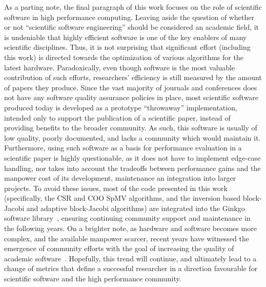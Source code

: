 As a parting note, the final paragraph of this work focuses on the role of
scientific software in high performance computing. Leaving aside the question of
whether or not ``scientific software engineering'' should be considered an
academic field, it is undeniable that highly efficient software is one of the
key enablers of many scientific disciplines. Thus, it is not surprising that
significant effort (including this work) is directed towards the optimization of
various algorithms for the latest hardware. Paradoxically, even though software
is the most valuable contribution of such efforts, researchers' efficiency is
still measured by the amount of papers they produce. Since the vast majority of
journals and conferences does not have any software quality assurance policies
in place, most scientific software produced today is developed as a prototype
``throwaway'' implementation, intended only to support the publication of a
scientific paper, instead of providing benefits to the broader community. As
such, this software is usually of low quality, poorly documented, and lacks a
community which would maintain it. Furthermore, using such software as a basis
for performance evaluation in a scientific paper is highly questionable, as it
does not have to implement edge-case handling, nor takes into account the
tradeoffs between performance gains and the manpower cost of its development,
maintenance an integration into larger projects. To avoid these issues, most of
the code presented in this work (specifically, the CSR and COO SpMV algorithms,
and the inversion based block-Jacobi and adaptive block-Jacobi algorithms) are
integrated into the Ginkgo software library~\cite{ginkgo}, ensuring continuing
community support and maintenance in the following years. On a brighter note, as
hardware and software becomes more complex, and the available manpower scarcer,
recent years have witnessed the emergence of community efforts with the goal of
increasing the quality of academic software~\cite{toms,xsdk,bssw,patch-contrib}.
Hopefully, this trend will continue, and ultimately lead to a change of metrics
that define a successful researcher in a direction favourable for scientific
software and the high performance community.
